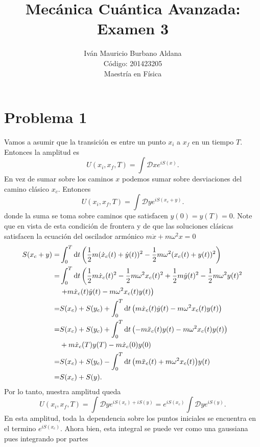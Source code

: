 \documentclass{article}
\title{Mecánica Cuántica Avanzada:\\
Examen 3}
\author{Iván Mauricio Burbano Aldana\\
Código: 201423205\\
Maestría en Física}
\begin{document}
\maketitle

\section*{Problema 1}

Vamos a asumir que la transición es entre un punto $x_i$ a $x_f$ en un tiempo $T$.  Entonces la amplitud es
\begin{equation}
U(x_i,x_f,T)=\int\mathcal{D}xe^{iS(x)}.
\end{equation}
En vez de sumar sobre los caminos $x$ podemos sumar sobre desviaciones del camino clásico $x_c$. Entonces
\begin{equation}
U(x_i,x_f,T)=\int\mathcal{D}ye^{iS(x_c+y)}.
\end{equation}
donde la suma se toma sobre caminos que satisfacen $y(0)=y(T)=0$. Note que en vista de esta condición de frontera y de que las soluciones clásicas satisfacen la ecuación del oscilador armónico $m\ddot{x}+m\omega^2x=0$
\begin{align}
\begin{split}
S(x_c+y)=&\int_0^T\dd{t}\qty(\frac{1}{2}m(\dot{x}_c(t)+\dot{y}(t))^2-\frac{1}{2}m\omega^2(x_c(t)+y(t))^2)\\
=&\int_0^T\dd{t}\left(\frac{1}{2}m\dot{x}_c(t)^2-\frac{1}{2}m\omega^2x_c(t)^2+\frac{1}{2}m\dot{y}(t)^2-\frac{1}{2}m\omega^2y(t)^2\right.\\
&\left.+m\dot{x}_c(t)\dot{y}(t)-m\omega^2x_c(t)y(t)\right)\\
=&S(x_c)+S(y_c)+\int_0^T\dd{t}\qty(m\dot{x}_c(t)\dot{y}(t)-m\omega^2x_c(t)y(t))\\
=&S(x_c)+S(y_c)+\int_0^T\dd{t}\qty(-m\ddot{x}_c(t)y(t)-m\omega^2x_c(t)y(t))\\
&+m\dot{x}_c(T)y(T)-m\dot{x}_c(0)y(0)\\
=&S(x_c)+S(y_c)-\int_0^T\dd{t}\qty(m\ddot{x}_c(t)+m\omega^2x_c(t))y(t)\\
=&S(x_c)+S(y).
\end{split}
\end{align} 
Por lo tanto, nuestra amplitud queda 
\begin{equation}
U(x_i,x_f,T)=\int\mathcal{D}ye^{iS(x_c)+iS(y)}=e^{iS(x_c)}\int\mathcal{D}ye^{iS(y)}.
\end{equation}
En esta amplitud, toda la dependencia sobre los puntos iniciales se encuentra en el termino $e^{iS(x_c)}$. Ahora bien, esta integral se puede ver como una gaussiana pues integrando por partes
\end{document}
